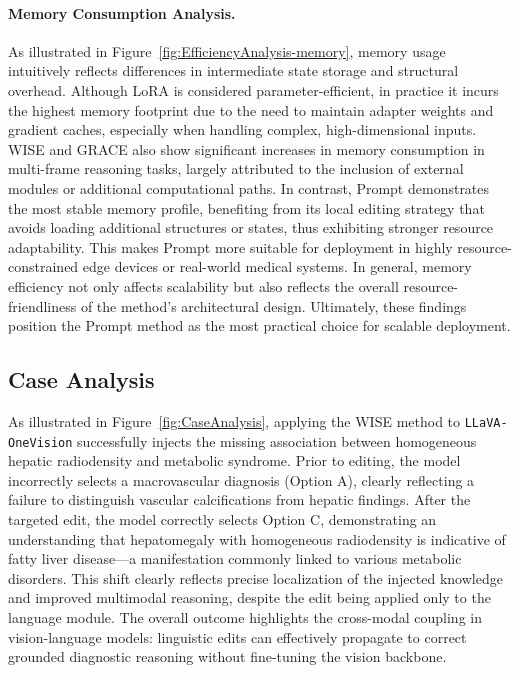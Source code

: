 \documentclass[letterpaper]{article} %
\begin{document}
\paragraph{Memory Consumption Analysis.}
As illustrated in Figure~\ref{fig:EfficiencyAnalysis-memory}, memory usage intuitively reflects differences in intermediate state storage and structural overhead. Although LoRA is considered parameter-efficient, in practice it incurs the highest memory footprint due to the need to maintain adapter weights and gradient caches, especially when handling complex, high-dimensional inputs. WISE and GRACE also show significant increases in memory consumption in multi-frame reasoning tasks, largely attributed to the inclusion of external modules or additional computational paths. In contrast, Prompt demonstrates the most stable memory profile, benefiting from its local editing strategy that avoids loading additional structures or states, thus exhibiting stronger resource adaptability. This makes Prompt more suitable for deployment in highly resource-constrained edge devices or real-world medical systems. In general, memory efficiency not only affects scalability but also reflects the overall resource-friendliness of the method’s architectural design. Ultimately, these findings position the Prompt method as the most practical choice for scalable deployment.







\subsection{Case Analysis}
As illustrated in Figure~\ref{fig:CaseAnalysis}, applying the WISE method to \texttt{LLaVA-OneVision} successfully injects the missing association between homogeneous hepatic radiodensity and metabolic syndrome. Prior to editing, the model incorrectly selects a macrovascular diagnosis (Option A), clearly reflecting a failure to distinguish vascular calcifications from hepatic findings. After the targeted edit, the model correctly selects Option C, demonstrating an understanding that hepatomegaly with homogeneous radiodensity is indicative of fatty liver disease—a manifestation commonly linked to various metabolic disorders. This shift clearly reflects precise localization of the injected knowledge and improved multimodal reasoning, despite the edit being applied only to the language module. The overall outcome highlights the cross-modal coupling in vision-language models: linguistic edits can effectively propagate to correct grounded diagnostic reasoning without fine-tuning the vision backbone.
\end{document}
